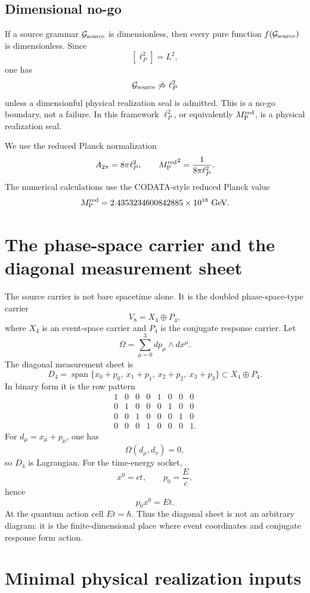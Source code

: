 \documentclass[11pt]{article}
\newcommand{\status}[1]{\textsf{#1}}
\newcommand{\seal}{\status{physical realization seal}}
\newcommand{\Mred}{M_{\rm P}^{\rm red}}
\begin{document}
\subsection{Dimensional no-go}

If a source grammar \(\mathcal G_{\rm source}\) is dimensionless, then every pure function \(f(\mathcal G_{\rm source})\) is dimensionless. Since
\[
[\ell_P^2]=L^2,
\]
one has
\[
\mathcal G_{\rm source}\not\Rightarrow \ell_P^2
\]
unless a dimensionful physical realization seal is admitted. This is a no-go boundary, not a failure. In this framework \(\ell_P^2\), or equivalently \(\Mred\), is a \seal.

We use the reduced Planck normalization
\[
A_{2\pi}=8\pi\ell_P^2,\qquad
{\Mred}^2=\frac{1}{8\pi\ell_P^2}.
\]
The numerical calculations use the CODATA-style reduced Planck value
\[
\Mred=2.4353234600842885\times 10^{18}\ {\rm GeV}.
\]

\section{The phase-space carrier and the diagonal measurement sheet}

The source carrier is not bare spacetime alone. It is the doubled phase-space-type carrier
\[
V_8=X_4\oplus P_4,
\]
where \(X_4\) is an event-space carrier and \(P_4\) is the conjugate response carrier. Let
\[
\Omega=\sum_{\mu=0}^3 dp_\mu\wedge dx^\mu.
\]
The diagonal measurement sheet is
\[
D_4=\operatorname{span}\{x_0+p_0,\ x_1+p_1,\ x_2+p_2,\ x_3+p_3\}\subset X_4\oplus P_4.
\]
In binary form it is the row pattern
\[
\begin{array}{cccc|cccc}
1&0&0&0&1&0&0&0\\
0&1&0&0&0&1&0&0\\
0&0&1&0&0&0&1&0\\
0&0&0&1&0&0&0&1.
\end{array}
\]
For \(d_\mu=x_\mu+p_\mu\), one has
\[
\Omega(d_\mu,d_\nu)=0,
\]
so \(D_4\) is Lagrangian. For the time-energy socket,
\[
x^0=ct,\qquad p_0=\frac{E}{c},
\]
hence
\[
p_0x^0=Et.
\]
At the quantum action cell \(Et=\hbar\). Thus the diagonal sheet is not an arbitrary diagram: it is the finite-dimensional place where event coordinates and conjugate response form action.

\section{Minimal physical realization inputs}
\end{document}
